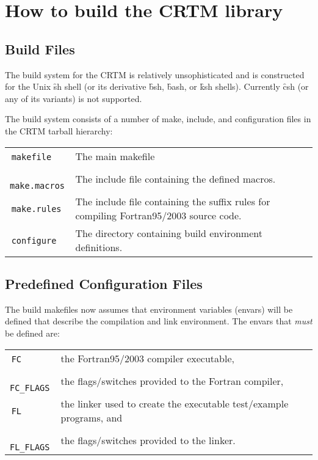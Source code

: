 \chapter{How to build the CRTM library}
\label{sec:build}

\section{Build Files}
The build system for the CRTM is relatively unsophisticated and is constructed for the Unix \f{sh} shell (or its derivative \f{bsh}, \f{bash}, or \f{ksh} shells). Currently \f{csh} (or any of its variants) is not supported.

The build system consists of a number of make, include, and configuration files in the CRTM tarball hierarchy:

\begin{tabular}{l@{ : }p{4.75in}}
  \,\texttt{makefile} & The main makefile\\
  \,\texttt{make.macros} & The include file containing the defined macros.\\
  \,\texttt{make.rules} & The include file containing the suffix rules for compiling Fortran95/2003 source code.\\
  \,\texttt{configure} & The directory containing build environment definitions.\\
\end{tabular}

\section{Predefined Configuration Files}
The build makefiles now assumes that environment variables (envars) will be defined that describe the compilation and link environment. The envars that \emph{must} be defined are:

\begin{tabular}{l@{ : }p{4.75in}}
  \,\texttt{FC}        & the Fortran95/2003 compiler executable,\\
  \,\texttt{FC\_FLAGS} & the flags/switches provided to the Fortran compiler,\\
  \,\texttt{FL}        & the linker used to create the executable test/example programs, and\\
  \,\texttt{FL\_FLAGS} & the flags/switches provided to the linker.\\
\end{tabular}
  
